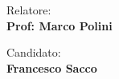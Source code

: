 \begin{titlepage}
\begin{minipage}[t]{0.47\textwidth}
	{\large{Relatore:}{\normalsize\vspace{3mm}
	\bf\\ \large{Prof: Marco Polini} }}
\end{minipage}
\hfill
\begin{minipage}[t]{0.47\textwidth}\raggedleft
	{\large{Candidato:}{\normalsize\vspace{3mm} \bf\\ \large{Francesco Sacco}}}
\end{minipage}

\vspace{19mm}
\hrulefill
\\

\end{titlepage}
